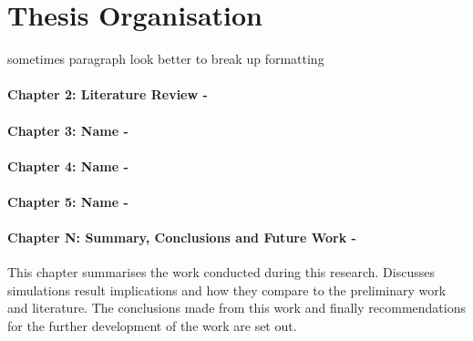 \section{Thesis Organisation}

sometimes paragraph look better to break up formatting

\paragraph{Chapter 2: Literature Review -} 

\paragraph{Chapter 3: Name -}

\paragraph{Chapter 4: Name -} 

\paragraph{Chapter 5: Name -}

\paragraph{Chapter N: Summary, Conclusions and Future Work -}  This chapter summarises the work conducted during this research. Discusses simulations result implications and how they compare to the preliminary work and literature. The conclusions made from this work and finally recommendations for the further development of the work are set out.


